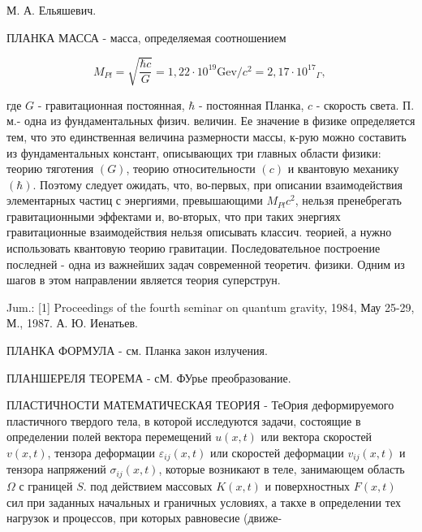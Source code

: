 \documentclass[10pt]{article}
\begin{document}
М. А. Ельяшевич.



ПЛАНКА МАССА - масса, определяемая соотношением



\[

M_{P l}=\sqrt{\frac{\hbar c}{G}}=1,22 \cdot 10^{19} \mathrm{Gev} / c^{2}=2,17 \cdot 10^{17}{ }_{\Gamma} \text {, }

\]



где $G$ - гравитационная постоянная, $\hbar$ - постоянная Планка, $c$ - скорость света. П. м.- одна из фундаментальных физич. величин. Ее значение в физике определяется тем, что это единственная величина размерности массы, к-рую можно составить из фундаментальных констант, описывающих три главных области физики: теорию тяготения $(G)$, теорию относительности $(c)$ и квантовую механику $(\hbar)$. Поэтому следует ожидать, что, во-первых, при описании взаимодействия элементарных частиц с энергиями, превышающими $M_{P l} c^{2}$, нельзя пренебрегать гравитационными эффектами и, во-вторых, что при таких энергиях гравитационные взаимодействия нельзя описывать классич. теорией, а нужно использовать квантовую теорию гравитации. Последовательное построение последней - одна из важнейших задач современной теоретич. физики. Одним из шагов в этом направлении является теория суперструн.



Jum.: [1] Proceedings of the fourth seminar on quantum gravity, 1984, Мау 25-29, М., 1987. А. Ю. Иенатьев.



ПЛАНКА ФОРМУЛА - см. Планка закон излучения.



ПЛАНШЕРЕЛЯ ТЕОРЕМА - сМ. ФУрье преобразование.



ПЛАСТИЧНОСТИ МАТЕМАТИЧЕСКАЯ ТЕОРИЯ - ТеОрия деформируемого пластичного твердого тела, в которой исследуются задачи, состоящие в определении полей вектора перемещений $u(x, t)$ или вектора скоростей $v(x, t)$, тензора деформации $\varepsilon_{i j}(x, t)$ или скоростей деформации $v_{i j}(x, t)$ и тензора напряжений $\sigma_{i j}(x, t)$, которые возникают в теле, занимающем область $\Omega$ с границей $S$. под действием массовых $K(x, t)$ и поверхностных $F(x, t)$ сил при заданных начальных и граничных условиях, а такхе в определении тех нагрузок и процессов, при которых равновесие (движе-
\end{document}
